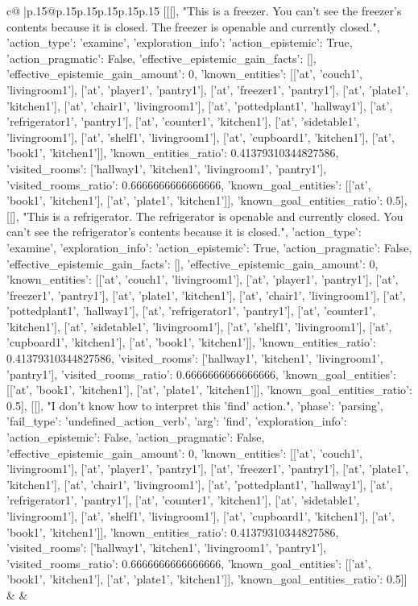 \documentclass{article}
\begin{document}
{\begin{supertabular}{c@{$\;$}|p{.15\linewidth}@{}p{.15\linewidth}p{.15\linewidth}p{.15\linewidth}p{.15\linewidth}p{.15\linewidth}}
{{{	 [[[], "This is a freezer. You can't see the freezer's contents because it is closed. The freezer is openable and currently closed.", {'action_type': 'examine', 'exploration_info': {'action_epistemic': True, 'action_pragmatic': False, 'effective_epistemic_gain_facts': [], 'effective_epistemic_gain_amount': 0, 'known_entities': [['at', 'couch1', 'livingroom1'], ['at', 'player1', 'pantry1'], ['at', 'freezer1', 'pantry1'], ['at', 'plate1', 'kitchen1'], ['at', 'chair1', 'livingroom1'], ['at', 'pottedplant1', 'hallway1'], ['at', 'refrigerator1', 'pantry1'], ['at', 'counter1', 'kitchen1'], ['at', 'sidetable1', 'livingroom1'], ['at', 'shelf1', 'livingroom1'], ['at', 'cupboard1', 'kitchen1'], ['at', 'book1', 'kitchen1']], 'known_entities_ratio': 0.41379310344827586, 'visited_rooms': ['hallway1', 'kitchen1', 'livingroom1', 'pantry1'], 'visited_rooms_ratio': 0.6666666666666666, 'known_goal_entities': [['at', 'book1', 'kitchen1'], ['at', 'plate1', 'kitchen1']], 'known_goal_entities_ratio': 0.5}}], [[], "This is a refrigerator. The refrigerator is openable and currently closed. You can't see the refrigerator's contents because it is closed.", {'action_type': 'examine', 'exploration_info': {'action_epistemic': True, 'action_pragmatic': False, 'effective_epistemic_gain_facts': [], 'effective_epistemic_gain_amount': 0, 'known_entities': [['at', 'couch1', 'livingroom1'], ['at', 'player1', 'pantry1'], ['at', 'freezer1', 'pantry1'], ['at', 'plate1', 'kitchen1'], ['at', 'chair1', 'livingroom1'], ['at', 'pottedplant1', 'hallway1'], ['at', 'refrigerator1', 'pantry1'], ['at', 'counter1', 'kitchen1'], ['at', 'sidetable1', 'livingroom1'], ['at', 'shelf1', 'livingroom1'], ['at', 'cupboard1', 'kitchen1'], ['at', 'book1', 'kitchen1']], 'known_entities_ratio': 0.41379310344827586, 'visited_rooms': ['hallway1', 'kitchen1', 'livingroom1', 'pantry1'], 'visited_rooms_ratio': 0.6666666666666666, 'known_goal_entities': [['at', 'book1', 'kitchen1'], ['at', 'plate1', 'kitchen1']], 'known_goal_entities_ratio': 0.5}}], [[], "I don't know how to interpret this 'find' action.", {'phase': 'parsing', 'fail_type': 'undefined_action_verb', 'arg': 'find', 'exploration_info': {'action_epistemic': False, 'action_pragmatic': False, 'effective_epistemic_gain_amount': 0, 'known_entities': [['at', 'couch1', 'livingroom1'], ['at', 'player1', 'pantry1'], ['at', 'freezer1', 'pantry1'], ['at', 'plate1', 'kitchen1'], ['at', 'chair1', 'livingroom1'], ['at', 'pottedplant1', 'hallway1'], ['at', 'refrigerator1', 'pantry1'], ['at', 'counter1', 'kitchen1'], ['at', 'sidetable1', 'livingroom1'], ['at', 'shelf1', 'livingroom1'], ['at', 'cupboard1', 'kitchen1'], ['at', 'book1', 'kitchen1']], 'known_entities_ratio': 0.41379310344827586, 'visited_rooms': ['hallway1', 'kitchen1', 'livingroom1', 'pantry1'], 'visited_rooms_ratio': 0.6666666666666666, 'known_goal_entities': [['at', 'book1', 'kitchen1'], ['at', 'plate1', 'kitchen1']], 'known_goal_entities_ratio': 0.5}}]] 
	  } 
	   } 
	   } 
	 & & \\ 
 


\end{supertabular}}
\end{document}
